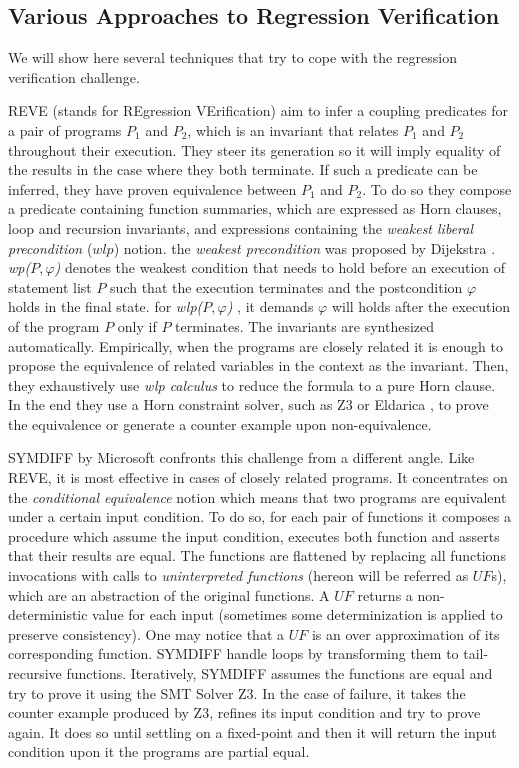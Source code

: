\subsection{Various Approaches to Regression Verification}
We will show here several techniques that try to cope with the regression verification challenge.

REVE (stands for REgression VErification) \cite{DBLP:conf/kbse/FelsingGKRU14} aim to infer a coupling predicates for a pair of programs $P_1$ and $P_2$, which is an invariant that relates $P_1$ and $P_2$ throughout their execution. They steer its generation so it will imply equality of the results in the case where they both terminate. If such a predicate can be inferred, they have proven equivalence between $P_1$ and $P_2$. To do so they compose a predicate containing function summaries, which are expressed as Horn clauses, loop and recursion invariants, and expressions containing the \emph{weakest liberal precondition} ($wlp$) notion. the \emph{weakest precondition} was proposed by Dijekstra \cite{DBLP:journals/cacm/Dijkstra75}. \emph{wp($P,\varphi$)} denotes the weakest condition that needs to hold before an execution of statement list $P$ such that the execution terminates and the postcondition $\varphi$ holds in the final state. for \emph{wlp($P,\varphi$)} , it demands $\varphi$ will holds after the execution of the program $P$ only if $P$ terminates. The invariants are synthesized automatically. Empirically, when the programs are closely related it is enough to propose the equivalence of related variables in the context as the invariant. Then, they exhaustively use \emph{wlp calculus} to reduce the formula to a pure Horn clause. In the end they use a Horn constraint solver, such as Z3 \cite{DBLP:conf/sat/HoderB12} or Eldarica \cite{DBLP:conf/cav/RummerHK13}, to prove the equivalence or generate a counter example upon non-equivalence.

SYMDIFF by Microsoft \cite{DBLP:conf/cav/LahiriHKR12} confronts this challenge from a different angle. Like REVE, it is most effective in cases of closely related programs. It concentrates on the \emph{conditional equivalence} notion which means that two programs are equivalent under a certain input condition. To do so, for each pair of functions it composes a procedure which assume the input condition, executes both function and asserts that their results are equal. The functions are flattened by replacing all functions invocations with calls to \emph{uninterpreted functions} (hereon will be referred as $UF$s), which are an abstraction of the original functions. A $UF$ returns a non-deterministic value for each input (sometimes some determinization is applied to preserve consistency). One may notice that a $UF$ is an over approximation of its corresponding function. SYMDIFF handle loops by transforming them to tail-recursive functions. Iteratively, SYMDIFF assumes the functions are equal and try to prove it using the SMT Solver Z3. In the case of failure, it takes the counter example produced by Z3, refines its input condition and try to prove again. It does so until settling on a fixed-point and then it will return the input condition upon it the programs are partial equal.


